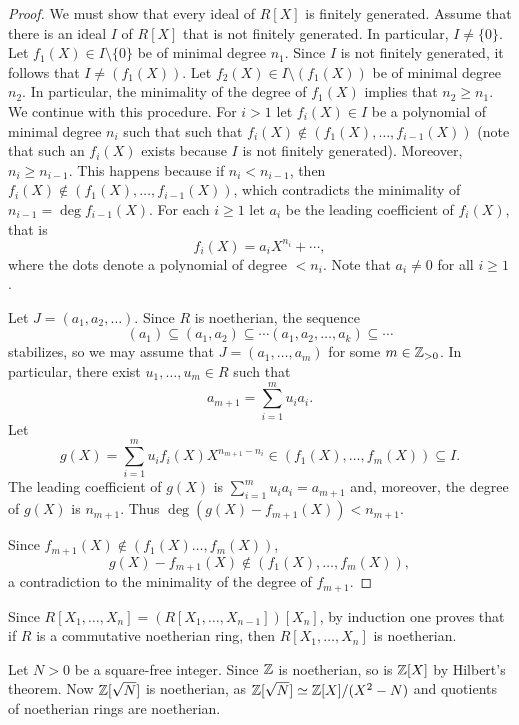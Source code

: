 \begin{proof}
	We must show that every ideal of $R[X]$ is finitely generated. Assume that
	there is an ideal $I$ of $R[X]$ that is not finitely generated. In particular, $I\ne\{0\}$. 
	Let $f_1(X)\in I\setminus\{0\}$ be of minimal degree $n_1$. 
	Since $I$ is not finitely generated, it follows that 
	$I\ne (f_1(X))$. Let $f_2(X)\in I\setminus (f_1(X))$ be
	of minimal degree $n_2$. In particular, the minimality of the degree of $f_1(X)$ implies that 
	$n_2\geq n_1$. 
	We continue with this procedure. For $i>1$ let 
	$f_i(X)\in I$ be a polynomial of minimal degree $n_i$ such that  
	such that $f_i(X)\not\in(f_1(X),\dots,f_{i-1}(X))$ (note
	that such an $f_i(X)$ exists because $I$ is not finitely generated). 
	Moreover, $n_i\geq n_{i-1}$. This happens because 
	if $n_i<n_{i-1}$, then
	$f_i(X)\not\in (f_1(X),\dots,f_{i-1}(X))$, which contradicts
	the minimality of $n_{i-1}=\deg f_{i-1}(X)$. 
	For each $i\geq1$ 
	let $a_i$ be the leading coefficient of $f_i(X)$, that is
	\[
	f_i(X)=a_iX^{n_i}+\cdots,
	\]
	where the dots denote a polynomial of 
	degree $<n_i$. Note that 
	$a_i\ne 0$ for all $i\geq 1$. 
	
	Let $J=(a_1,a_2,\dots)$. Since $R$ is noetherian, the sequence
	\[
	(a_1)\subseteq (a_1,a_2)\subseteq\cdots(a_1,a_2,\dots,a_k)\subseteq\cdots
	\]
	stabilizes, so we may assume that 
	$J=(a_1,\dots,a_m)$ for some $m\in\mathbb{Z}_{>0}$. 
	In particular, there exist $u_1,\dots,u_m\in R$ such that 
	\[
	a_{m+1}=\sum_{i=1}^m u_ia_i.
	\]
	Let 
	\[
	g(X)=\sum_{i=1}^mu_if_i(X)X^{n_{m+1}-n_i}\in (f_1(X),\dots,f_m(X))\subseteq I.
	\]
	The leading coefficient of $g(X)$ is $\sum_{i=1}^mu_ia_i=a_{m+1}$ and, moreover, 
	the degree of $g(X)$ is $n_{m+1}$. Thus $\deg(g(X)-f_{m+1}(X))<n_{m+1}$. 
	
	Since $f_{m+1}(X)\not\in (f_1(X)\dots,f_m(X))$, 
	\[
	g(X)-f_{m+1}(X)\not\in (f_1(X),\dots,f_m(X)),
	\]
	a contradiction to the minimality of the degree of $f_{m+1}$.  
\end{proof}

Since $R[X_1,\dots,X_n]=(R[X_1,\dots,X_{n-1}])[X_n]$, by induction 
one proves that if $R$ is a commutative noetherian ring, 
then $R[X_1,\dots,X_n]$ is noetherian. 
 
\begin{example}
    Let $N>0$ be a square-free integer.  
	Since $\mathbb{Z}$ is noetherian, so is $\mathbb{Z}[X]$ by Hilbert's theorem. Now 
	$\mathbb{Z}[\sqrt{N}]$ is noetherian, as $\mathbb{Z}[\sqrt{N}]\simeq\mathbb{Z}[X]/(X^2-N)$ and quotients
	of noetherian rings are noetherian.  	
\end{example}

